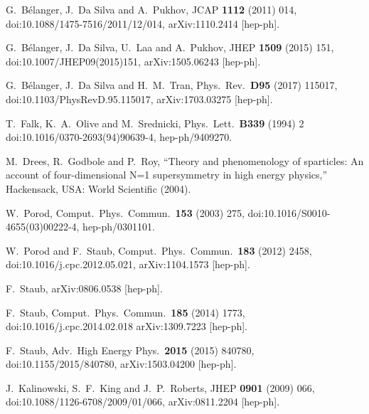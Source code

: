 \documentclass[a4paper,11pt]{article}
\begin{document}
\begin{thebibliography}{99}
  G.~B\'elanger, J.~Da Silva and A.~Pukhov,
  JCAP {\bf 1112} (2011) 014,
  doi:10.1088/1475-7516/2011/12/014,
  arXiv:1110.2414 [hep-ph].

  G.~B\'elanger, J.~Da Silva, U.~Laa and A.~Pukhov,
  JHEP {\bf 1509} (2015) 151,
  doi:10.1007/JHEP09(2015)151,
  arXiv:1505.06243 [hep-ph].

  G.~B\'elanger, J.~Da Silva and H.~M.~Tran,
  Phys.\ Rev.\ {\bf D95} (2017) 115017,
  doi:10.1103/PhysRevD.95.115017,
  arXiv:1703.03275 [hep-ph].

T.~Falk, K.~A.~Olive and M.~Srednicki,
Phys.\ Lett.\ {\bf B339} (1994) 2
doi:10.1016/0370-2693(94)90639-4,
hep-ph/9409270.

M.~Drees, R.~Godbole and P.~Roy, ``Theory and phenomenology of
sparticles: An account of four-dimensional N=1 supersymmetry in high
energy physics,'' Hackensack, USA: World Scientific (2004).

W.~Porod,
Comput.\ Phys.\ Commun.\  {\bf 153} (2003) 275, 
doi:10.1016/S0010-4655(03)00222-4,
hep-ph/0301101.

W.~Porod and F.~Staub,
Comput.\ Phys.\ Commun.\  {\bf 183} (2012) 2458, 
doi:10.1016/j.cpc.2012.05.021,
arXiv:1104.1573 [hep-ph].

F.~Staub,
arXiv:0806.0538 [hep-ph].

F.~Staub,
Comput.\ Phys.\ Commun.\  {\bf 185} (2014) 1773, 
doi:10.1016/j.cpc.2014.02.018
arXiv:1309.7223 [hep-ph].

F.~Staub,
Adv.\ High Energy Phys.\  {\bf 2015} (2015) 840780, 
doi:10.1155/2015/840780,
arXiv:1503.04200 [hep-ph].

J.~Kalinowski, S.~F.~King and J.~P.~Roberts,
JHEP {\bf 0901} (2009) 066, 
doi:10.1088/1126-6708/2009/01/066,
arXiv:0811.2204 [hep-ph].


\end{thebibliography}
\end{document}

